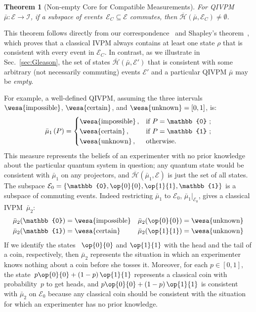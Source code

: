 \documentclass[english,reprint, aps, prl,superscriptaddress, showpacs,
showkeys, longbibliography, amsmath, amssymb, floatfix]{revtex4-1}
\theoremstyle{plain}
\newtheorem{thm}{Theorem}
\theoremstyle{definition}
\newcommand{\Hilb}{\mathcal{H}}
\newcommand{\events}{\ensuremath{\mathcal{E}}}
\newcommand{\imposs}{{\text{\wesa{impossible}}}}
\newcommand{\necess}{{\text{\wesa{certain}}}}
\newcommand{\unknown}{{\text{\wesa{unknown}}}}
\newcommand{\proj}[1]{\op{#1}{#1}}
\newcommand{\coreBorn}{\ensuremath{\overline{\Hilb}}}
\begin{document}
\begin{thm}[Non-empty Core for Compatible Measurements] \label{thm:Shapley}
  For QIVPM~$\bar{\mu}:\events\rightarrow\mathscr{I}$, if a subspace
  of events~$\events_C\subseteq\events$ commutes, then
  $\coreBorn\left(\bar{\mu},\events_C\right)\ne\emptyset$.
\end{thm}

This theorem follows directly from our
correspondence~\cite{HOSTunpublished} and Shapley's
theorem~\cite{Shapley1971,GilboaSchmeidler1994,Grabisch2016}, which
proves that a classical IVPM always contains at least one state $\rho$
that is consistent with every event in $\events_C$. In contrast, as we
illustrate in Sec.~\ref{sec:Gleason}, the set of states
$\coreBorn\left(\bar{\mu},\events'\right)$ that is consistent with
some arbitrary (not necessarily commuting) events $\events'$ and a
particular QIVPM $\bar{\mu}$ may be \emph{empty}.

For example, a well-defined  
QIVPM, assuming the three intervals $\imposs$, $\necess$, and
$\unknown=\left[0,1\right]$, is:
\begin{equation}
\bar{\mu}_{1}\left(P\right)=\begin{cases}
\imposs\,, & \text{if }P=\mathbb{0}\text{ ;}\\
\necess\,, & \text{if }P=\mathbb{1}\text{ ;}\\
\unknown\,, & \text{otherwise.}
\end{cases}\label{eq:no-information-IVPM}
\end{equation}
This measure represents the beliefs of an experimenter with no prior
knowledge about the particular quantum system in question; any quantum
state would be consistent with $\bar{\mu}_{1}$ on any projectors, and
$\coreBorn\left(\bar{\mu}_{1},\events\right)$ is just the set of all
states. The subspace
$\events_{0}=\left\{ \mathbb{0},\proj{0},\proj{1},\mathbb{1}\right\} $
is a subspace of commuting events. Indeed restricting $\bar{\mu}_{1}$
to $\events_{0}$, $\bar{\mu}_{1}|_{\events_{0}}$, gives a classical
IVPM~$\bar{\mu}_{2}$:
\begin{equation}
\begin{aligned}\bar{\mu}_{2}(\mathbb{0}) & =\imposs & \bar{\mu}_{2}(\proj{0}) & =\unknown\\
\bar{\mu}_{2}(\mathbb{1}) & =\necess & \bar{\mu}_{2}(\proj{1}) & =\unknown
\end{aligned}
\label{eq:classical-no-information-IVPM}
\end{equation}
If we identify the states ~$\proj{0}$ and $\proj{1}$ with the head
and the tail of a coin, respectively, then $\bar{\mu}_{2}$ represents
the situation in which an experimenter knows nothing about a coin
before she tosses it. Moreover, for each $p\in\left[0,1\right]$, the
state~$p\proj{0}+\left(1-p\right)\proj{1}$ represents a classical
coin with probability~$p$ to get heads, and
$p\proj{0}+\left(1-p\right)\proj{1}$ is consistent with
$\bar{\mu}_{2}$ on $\events_{0}$ because any classical coin should be
consistent with the situation for which an experimenter has no prior
knowledge.
\end{document}
